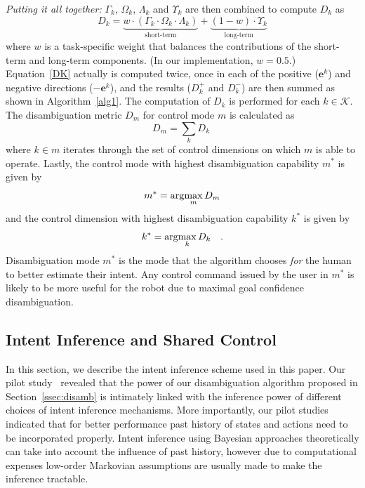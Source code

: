 \textit{Putting it all together:}
$\Gamma_k$, $\Omega_k$, $\Lambda_k$ and $\Upsilon_k$ are then combined to compute $D_{k}$ as 
\begin{equation}\label{DK}
D_{k} = \underbrace{w\cdot(\Gamma_k\cdot \Omega_k\cdot\Lambda_k)}_{\text{short-term}} + \underbrace{(1 - w)\cdot \Upsilon_k}_{\text{long-term}}
\end{equation}
where $w$ is a task-specific weight that balances the contributions of the short-term and long-term components. (In our implementation, $w=0.5$.) Equation~\ref{DK} actually is computed twice, once in each of the positive ($\boldsymbol{e}^k$) and negative directions ($-\boldsymbol{e}^k$), and the results ($D_k^+$ and $D_k^-$) are then summed as shown in Algorithm~\ref{alg1}. The computation of $D_k$ is performed for each $k \in \mathcal{K}$. The disambiguation metric $D_m$ for control mode $m$ is calculated as 
\begin{equation}\label{EQ2}
D_m = \sum_{k} D_{k} \;
\end{equation}
where $k \in m$ iterates through the set of control dimensions on which $m$ is able to operate.
Lastly, the control mode with highest disambiguation capability $m^*$ is given by
\begin{equation*}
m^* = \arg\!\max_m  D_{m}
\end{equation*}
and the control dimension with highest disambiguation capability $k^{*}$ is given by
\begin{equation*}
k^* = \arg\!\max_k D_k~~~.
\end{equation*}
Disambiguation mode $m^{*}$ is the mode that the algorithm chooses \textit{for} the human to better estimate their intent. Any control command issued by the user in $m^*$ is likely to be more useful for the robot due to maximal goal confidence disambiguation.
\subsection{Intent Inference and Shared Control}\label{ssec:inference}
In this section,  we describe the intent inference scheme used in this paper. Our pilot study~\cite{gopinath2017mode} revealed that the power of our disambiguation algorithm proposed in Section~\ref{ssec:disamb} is intimately linked with the inference power of different choices of intent inference mechanisms. More importantly, our pilot studies indicated that for better performance past history of states and actions need to be incorporated properly. Intent inference using Bayesian approaches theoretically can take into account the influence of past history, however due to computational expenses low-order Markovian assumptions are usually made to make the inference tractable. 

